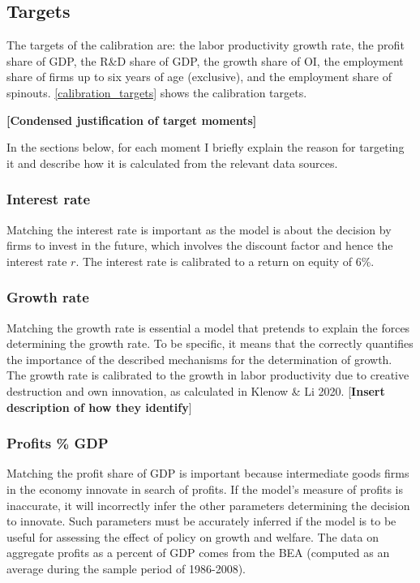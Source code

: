 \documentclass[11pt,english]{article}
\theoremstyle{remark}
\begin{document}
\subsection{Targets}

The targets of the calibration are: the labor productivity growth rate, the profit share of GDP, the R\&D share of GDP, the growth share of OI, the employment share of firms up to six years of age (exclusive), and the employment share of spinouts. \autoref{calibration_targets} shows the calibration targets. 

\textbf{[Condensed justification of target moments]}

In the sections below, for each moment I briefly explain the reason for targeting it and describe how it is calculated from the relevant data sources.

\subsubsection{Interest rate}

Matching the interest rate is important as the model is about the decision by firms to invest in the future, which involves the discount factor and hence the interest rate $r$. The interest rate is calibrated to a return on equity of 6\%. 

\subsubsection{Growth rate}

Matching the growth rate is essential a model that pretends to explain the forces determining the growth rate. To be specific, it means that the correctly quantifies the importance of the described mechanisms for the determination of growth. The growth rate is calibrated to the growth in labor productivity due to creative destruction and own innovation, as calculated in Klenow \& Li 2020. [\textbf{Insert description of how they identify}]

\subsubsection{Profits \% GDP} 

Matching the profit share of GDP is important because intermediate goods firms in the economy innovate in search of profits. If the model's measure of profits is inaccurate, it will incorrectly infer the other parameters determining the decision to innovate. Such parameters must be accurately inferred if the model is to be useful for assessing the effect of policy on growth and welfare. The data on aggregate profits as a percent of GDP comes from the BEA (computed as an average during the sample period of 1986-2008). 
\end{document}
